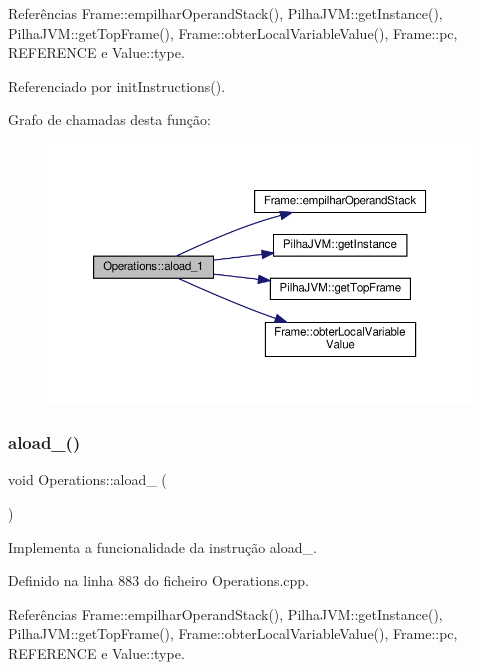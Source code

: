 Referências Frame\+::empilhar\+Operand\+Stack(), Pilha\+J\+V\+M\+::get\+Instance(), Pilha\+J\+V\+M\+::get\+Top\+Frame(), Frame\+::obter\+Local\+Variable\+Value(), Frame\+::pc, R\+E\+F\+E\+R\+E\+N\+CE e Value\+::type.



Referenciado por init\+Instructions().

Grafo de chamadas desta função\+:
\nopagebreak
\begin{figure}[H]
\begin{center}
\leavevmode
\includegraphics[width=350pt]{classOperations_a8291f2b716c1be7428d9b63a5225b52d_cgraph}
\end{center}
\end{figure}
\mbox{\label{classOperations_abd58f463152d7f88b9fb2f133c6ca184}} 
\subsubsection{\texorpdfstring{aload\+\_()}{aload\_2()}}
{\footnotesize\ttfamily void Operations\+::aload\+\_ (\begin{DoxyParamCaption}{ }\end{DoxyParamCaption})\hspace{0.3cm}{\ttfamily [private]}}



Implementa a funcionalidade da instrução aload\+\_. 



Definido na linha 883 do ficheiro Operations.\+cpp.



Referências Frame\+::empilhar\+Operand\+Stack(), Pilha\+J\+V\+M\+::get\+Instance(), Pilha\+J\+V\+M\+::get\+Top\+Frame(), Frame\+::obter\+Local\+Variable\+Value(), Frame\+::pc, R\+E\+F\+E\+R\+E\+N\+CE e Value\+::type.



